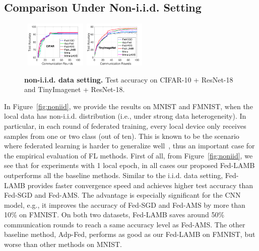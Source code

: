 \documentclass[nohyperref]{article}
\theoremstyle{plain}
\theoremstyle{definition}
\theoremstyle{remark}
\begin{document}
\vspace{-0.1in}
\subsection{Comparison Under Non-i.i.d. Setting}
\vspace{-0.02in}




\begin{figure}[b!]

\vspace{-0.1in}

    \begin{center}
        \mbox{\hspace{-0.1in}
        \includegraphics[width=0.26\textwidth]{figure_mime/cifar_testerror_resnet18_ep1_client2_iid0_mime.pdf}
        \hspace{-0.1in}
        \includegraphics[width=0.26\textwidth]{figure_mime/tinyimagenet_testerror_resnet18_ep1_client2_iid0_mime.pdf}\hspace{-0.1in}
        }
    \end{center}
	\caption{\textbf{non-i.i.d. data setting.} Test accuracy on CIFAR-10 + ResNet-18 and TinyImagenet + ResNet-18.
	}
	\label{fig:noniidresnet18}
\end{figure}


In Figure~\ref{fig:noniid}, we provide the results on  MNIST and FMNIST, when the local data has non-i.i.d. distribution (i.e., under strong data heterogeneity). In particular, in each round of federated training, every local device only receives samples from one or two class (out of ten). This is known to be the scenario where federated learning is harder to generalize well~\citep{mcmahan2017communication}, thus an important case for the empirical evaluation of FL methods. 
First of all, from Figure~\ref{fig:noniid}, we see that for experiments with 1 local epoch, in all cases our proposed Fed-LAMB outperforms all the baseline methods. Similar to the i.i.d. data setting, Fed-LAMB provides faster convergence speed and achieves higher test accuracy than Fed-SGD and Fed-AMS. The advantage is especially significant for the CNN model, e.g., it improves the accuracy of Fed-SGD and Fed-AMS by more than 10\% on FMNIST. On both two datasets, Fed-LAMB saves around 50\% communication rounds to reach a same accuracy level as Fed-AMS. The other baseline method, Adp-Fed, performs as good as our Fed-LAMB on FMNIST, but worse than other methods on MNIST.
\end{document}
